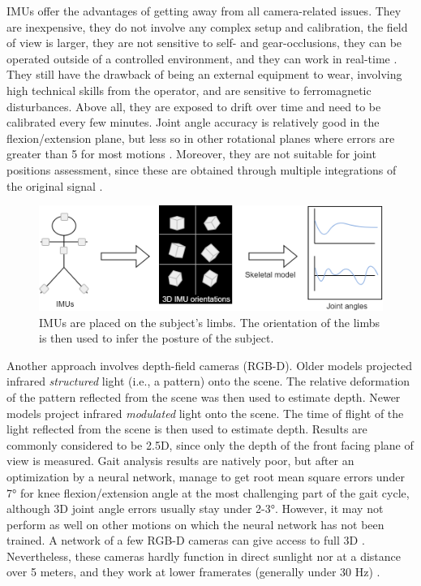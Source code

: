 IMUs offer the advantages of getting away from all camera-related issues. They are inexpensive, they do not involve any complex setup and calibration, the field of view is larger, they are not sensitive to self- and gear-occlusions, they can be operated outside of a controlled environment, and they can work in real-time \cite{Johnston2019,Chambers2015}. They still have the drawback of being an external equipment to wear, involving high technical skills from the operator, and are sensitive to ferromagnetic disturbances. Above all, they are exposed to drift over time and need to be calibrated every few minutes. Joint angle accuracy is relatively good in the flexion/extension plane, but less so in other rotational planes where errors are greater than 5\degree{} for most motions \cite{Zhang2013, Rekant2022}. Moreover, they are not suitable for joint positions assessment, since these are obtained through multiple integrations of the original signal \cite{Ahmad2013}. 

\begin{figure}[hbtp]
	\centering
	\def\svgwidth{1\columnwidth}
	\fontsize{10pt}{10pt}\selectfont
	\includegraphics[width=\linewidth]{"../Chap1/Figures/IMUs.png"}
	\caption{IMUs are placed on the subject's limbs. The orientation of the limbs is then used to infer the posture of the subject.}
	\label{fig_imus}
\end{figure}
\FloatBarrier

Another approach involves depth-field cameras (RGB-D). Older models projected infrared \textit{structured} light (i.e., a pattern) onto the scene. The relative deformation of the pattern reflected from the scene was then used to estimate depth. Newer models project infrared \textit{modulated} light onto the scene. The time of flight of the light reflected from the scene is then used to estimate depth. Results are commonly considered to be 2.5D, since only the depth of the front facing plane of view is measured. Gait analysis results are natively poor, but after an optimization by a neural network, \cite{Guo2022} manage to get root mean square errors under 7° for knee flexion/extension angle at the most challenging part of the gait cycle, although 3D joint angle errors usually stay under 2-3°. However, it may not perform as well on other motions on which the neural network has not been trained. A network of a few RGB-D cameras can give access to full 3D \cite{Carraro2017,Choppin2013,Colombel2020}. Nevertheless, these cameras hardly function in direct sunlight nor at a distance over 5 meters, and they work at lower framerates (generally under 30 Hz) \cite{Han2013, Pagliari2015}. 

